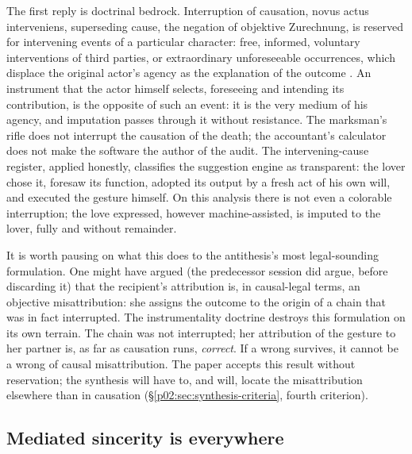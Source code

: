 The first reply is doctrinal bedrock. Interruption of causation, novus actus interveniens, superseding cause, the negation of objektive Zurechnung, is reserved for intervening events of a particular character: free, informed, voluntary interventions of third parties, or extraordinary unforeseeable occurrences, which displace the original actor's agency as the explanation of the outcome \parencite{hart1985causation,roxin2006strafrecht}. An instrument that the actor himself selects, foreseeing and intending its contribution, is the opposite of such an event: it is the very medium of his agency, and imputation passes through it without resistance. The marksman's rifle does not interrupt the causation of the death; the accountant's calculator does not make the software the author of the audit. The intervening-cause register, applied honestly, classifies the suggestion engine as transparent: the lover chose it, foresaw its function, adopted its output by a fresh act of his own will, and executed the gesture himself. On this analysis there is not even a colorable interruption; the love expressed, however machine-assisted, is imputed to the lover, fully and without remainder.

It is worth pausing on what this does to the antithesis's most legal-sounding formulation. One might have argued (the predecessor session did argue, before discarding it) that the recipient's attribution is, in causal-legal terms, an objective misattribution: she assigns the outcome to the origin of a chain that was in fact interrupted. The instrumentality doctrine destroys this formulation on its own terrain. The chain was not interrupted; her attribution of the gesture to her partner is, as far as causation runs, \emph{correct}. If a wrong survives, it cannot be a wrong of causal misattribution. The paper accepts this result without reservation; the synthesis will have to, and will, locate the misattribution elsewhere than in causation (\S\ref{p02:sec:synthesis-criteria}, fourth criterion).

\subsection{Mediated sincerity is everywhere}
\label{p02:sec:thesis-mediated}

